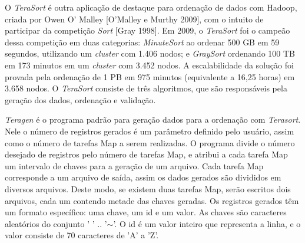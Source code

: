 %
%
%
%





O \textit{TeraSort} é outra aplicação de destaque para ordenação de dados com Hadoop, criada por Owen O' Malley [O'Malley e Murthy 2009], com o intuito de participar da competição \textit{Sort} [Gray 1998]. Em 2009, o \textit{TeraSort} foi o campeão dessa competição em duas categorias: \textit{MinuteSort} ao ordenar 500 GB em 59 segundos, utilizando um \textit{cluster} com 1.406 nodos; e \textit{GraySort} ordenando 100 TB em 173 minutos em um \textit{cluster} com 3.452 nodos. A escalabilidade da solução foi provada pela ordenação de 1 PB em 975 minutos (equivalente a 16,25 horas) em 3.658 nodos.
O \textit{TeraSort} consiste de três algoritmos, que são responsáveis pela geração dos dados, ordenação e validação. 

\textit{Teragen} é o programa padrão para geração dados para a ordenação com \textit{Terasort}.
Nele o número de registros gerados é um parâmetro definido pelo usuário, assim como o número de tarefas Map a serem realizadas. O programa divide o número desejado de registros pelo número de tarefas Map, e atribui a cada tarefa Map um intervalo de chaves para a geração de um arquivo. Cada tarefa Map corresponde a um arquivo de saída, assim os dados gerados são divididos em diversos arquivos. Deste modo, se existem duas tarefas Map, serão escritos dois arquivos, cada um contendo metade das chaves geradas. 
Os registros gerados têm um formato específico: uma chave, um id e um valor. As  chaves são caracteres aleatórios do conjunto ' ' .. '$\sim$'. O id é um valor inteiro que representa a linha, e o valor consiste de 70 caracteres de 'A' a 'Z'. 

